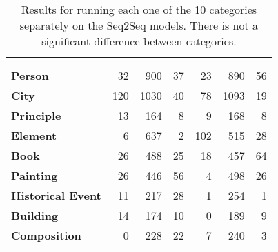\begin{table}[p]
	\centering
	\footnotesize
	\begin{tabular}{>{\bfseries}l | r r r | r r r}
		\toprule
			& \multicolumn{3}{|c}{\smallflan{}} & \multicolumn{3}{|c}{\bigflan{}} \\
			& \Parametric{} & \Contextual{} & \Other{} & \Parametric{} & \Contextual{} & \Other{} \\
		\midrule
			Person           &  32 &  900 & 37 &  23 &  890 & 56 \\
			City             & 120 & 1030 & 40 &  78 & 1093 & 19 \\
			Principle        &  13 &  164 &  8 &   9 &  168 &  8 \\
			Element          &   6 &  637 &  2 & 102 &  515 & 28 \\
			Book             &  26 &  488 & 25 &  18 &  457 & 64 \\
			Painting         &  26 &  446 & 56 &   4 &  498 & 26 \\
			Historical Event &  11 &  217 & 28 &   1 &  254 &  1 \\
			Building         &  14 &  174 & 10 &   0 &  189 &  9 \\
			Composition      &   0 &  228 & 22 &   7 &  240 &  3 \\
		\bottomrule
	\end{tabular}
	\caption{Results for running each one of the 10 categories separately on the Seq2Seq models. There is not a significant difference between categories.}
	\label{flan_cats_table}
\end{table}

